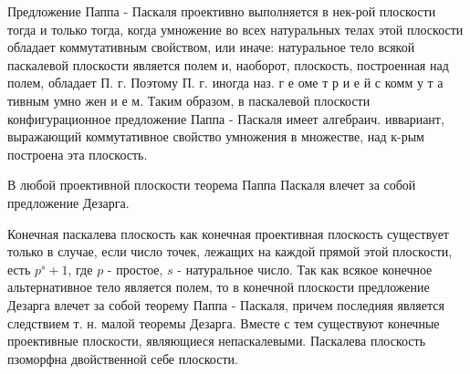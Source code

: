 \documentclass[10pt]{article}
\begin{document}
Предложение Паппа - Паскаля проективно выполняется в нек-рой плоскости тогда и только тогда, когда умножение во всех натуральных телах этой плоскости обладает коммутативным свойством, или иначе: натуральное тело всякой паскалевой плоскости является полем и, наоборот, плоскость, построенная над полем, обладает П. г. Поэтому П. г. иногда наз. г е оме т р и е й с комм у т а тивным умно жен и е м. Таким образом, в паскалевой плоскости конфигурационное предложение Паппа - Паскаля имеет алгебраич. иввариант, выражающий коммутативное свойство умножения в множестве, над к-рым построена эта плоскость.



В любой проективной плоскости теорема Паппа Паскаля влечет за собой предложение Дезарга.



Конечная паскалева плоскость как конечная проективная плоскость существует только в случае, если число точек, лежащих на каждой прямой этой плоскости, есть $p^{s}+1$, где $p$ - простое, $s$ - натуральное число. Так как всякое конечное альтернативное тело является полем, то в конечной плоскости предложение Дезарга влечет за собой теорему Паппа - Паскаля, причем последняя является следствием т. н. малой теоремы Дезарга. Вместе с тем существуют конечные проективные плоскости, являющиеся непаскалевыми. Паскалева плоскость пзоморфна двойственной себе плоскости.
\end{document}
